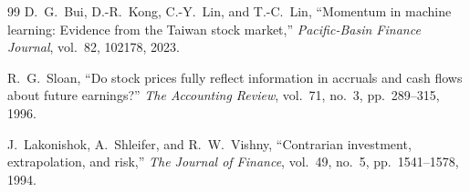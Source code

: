 \documentclass[conference]{IEEEtran}
\begin{document}
\begin{thebibliography}{99}
 D.~G.~Bui, D.-R.~Kong, C.-Y.~Lin, and T.-C.~Lin, ``Momentum in machine learning: Evidence from the Taiwan stock market,'' \emph{Pacific-Basin Finance Journal}, vol.~82, 102178, 2023.

 R.~G.~Sloan, ``Do stock prices fully reflect information in accruals and cash flows about future earnings?'' \emph{The Accounting Review}, vol.~71, no.~3, pp.~289--315, 1996.

 J.~Lakonishok, A.~Shleifer, and R.~W.~Vishny, ``Contrarian investment, extrapolation, and risk,'' \emph{The Journal of Finance}, vol.~49, no.~5, pp.~1541--1578, 1994.

\end{thebibliography}
\end{document}
